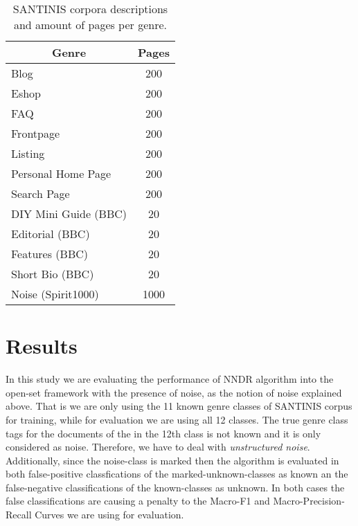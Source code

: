\documentclass[runningheads]{llncs}
\begin{document}
\begin{table}
\center
\begin{tabular}{|l|l|}
\hline
\multicolumn{1}{|c|}{Genre} & \multicolumn{1}{c|}{Pages} \\
\hline
\multicolumn{1}{|l|}{Blog} & \multicolumn{1}{c|}{200}  \\
\multicolumn{1}{|l|}{Eshop} & \multicolumn{1}{c|}{200} \\
\multicolumn{1}{|l|}{FAQ} & \multicolumn{1}{c|}{200} \\
\multicolumn{1}{|l|}{Frontpage} & \multicolumn{1}{c|}{200} \\
\multicolumn{1}{|l|}{Listing} & \multicolumn{1}{c|}{200} \\
\multicolumn{1}{|l|}{Personal Home Page} & \multicolumn{1}{c|}{200} \\
\multicolumn{1}{|l|}{Search Page} & \multicolumn{1}{c|}{200} \\
\multicolumn{1}{|l|}{DIY Mini Guide (BBC)} & \multicolumn{1}{c|}{20} \\
\multicolumn{1}{|l|}{Editorial (BBC)} & \multicolumn{1}{c|}{20} \\
\multicolumn{1}{|l|}{Features (BBC)} & \multicolumn{1}{c|}{20} \\
\multicolumn{1}{|l|}{Short Bio (BBC)} & \multicolumn{1}{c|}{20} \\
\multicolumn{1}{|l|}{Noise (Spirit1000)} & \multicolumn{1}{c|}{1000}  \\
\hline
\end{tabular}
\caption {SANTINIS corpora descriptions and amount of pages per genre.}
\label{tbl:genre_tags}
\end{table}


\section{Results}\label{sec:Experiments_Results}

In this study we are evaluating the performance of NNDR algorithm into the open-set framework with the presence of noise, as the notion of noise explained above. That is we are only using the 11 known genre classes of SANTINIS corpus for training, while for evaluation we are using all 12 classes. The true genre class tags for the documents of the in the 12th class is not known and it is only considered as noise. Therefore, we have to deal with \textit{unstructured noise}. Additionally, since the noise-class is marked then the algorithm is evaluated in both false-positive classfications of the marked-unknown-classes as known an the false-negative classifications of the known-classes as unknown. In both cases the false classifications are causing a penalty to the Macro-F1 and Macro-Precision-Recall Curves we are using for evaluation.
\end{document}
